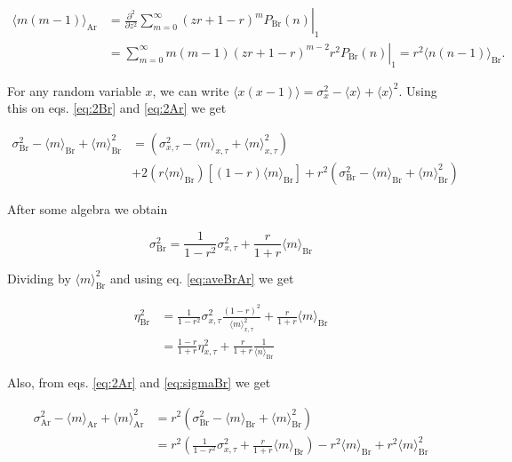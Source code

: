 \begin{equation}
  \label{eq:2Ar}
  \begin{split}
    \langle m(m-1)\rangle_\text{Ar} &= \left.\frac{\partial^2}{\partial z^2}\sum_{m=0}^\infty(zr+1-r)^mP_\text{Br}(n)\right|_1\\
    &= \left.\sum_{m=0}^\infty m(m-1)(zr+1-r)^{m-2}r^2P_\text{Br}(n)\right|_1 = r^2\langle n(n-1)\rangle_\text{Br}.
  \end{split}
\end{equation}

For any random variable $x$, we can write $\langle x(x-1)\rangle = \sigma_x^2 - \langle x\rangle + \langle x\rangle^2$. Using this on eqs. \ref{eq:2Br} and \ref{eq:2Ar} we get

\begin{equation*}
  \begin{split}
  \sigma^2_\text{Br}- \langle m\rangle_\text{Br} + \langle m\rangle^2_\text{Br} &= \left( \sigma^2_{x,\tau} - \langle m\rangle_{x,\tau} + \langle m\rangle_{x,\tau}^2\right)\\
&+ 2\left(r\langle m\rangle_\text{Br}\right)\left[(1-r)\langle m\rangle_\text{Br}\right]+r^2\left(\sigma^2_\text{Br}- \langle m\rangle_\text{Br} + \langle m\rangle^2_\text{Br}\right)
  \end{split}
\end{equation*}

After some algebra we obtain

\begin{equation}
  \label{eq:sigmaBr}
  \sigma^2_\text{Br} = \frac{1}{1-r^2}\sigma^2_{x,\tau}+\frac{r}{1+r}\langle m\rangle_\text{Br}
\end{equation}

Dividing by $\langle m\rangle_\text{Br}^2$ and using eq. \ref{eq:aveBrAr} we get

\begin{equation}
  \label{eq:bur-etaBr}
  \begin{split}
    \eta_\text{Br}^2 &= \frac{1}{1-r^2}\sigma_{x,\tau}^2\frac{(1-r)^2}{\langle m\rangle_{x,\tau}^2} + \frac{r}{1+r}\langle m\rangle_\text{Br}\\
    & = \frac{1-r}{1+r}\eta_{x,\tau}^2+\frac{r}{1+r}\frac{1}{\langle n\rangle_\text{Br}}
  \end{split}
\end{equation}

Also, from eqs. \ref{eq:2Ar} and \ref{eq:sigmaBr} we get

\begin{equation}
  \begin{split}
    \sigma^2_\text{Ar} - \langle m\rangle_\text{Ar} + \langle m\rangle_\text{Ar}^2 &= r^2\left(\sigma^2_\text{Br}- \langle m\rangle_\text{Br} + \langle m\rangle^2_\text{Br}\right)\\
  &=r^2\left(\frac{1}{1-r^2}\sigma^2_{x,\tau}+\frac{r}{1+r}\langle m\rangle_\text{Br}\right)-r^2\langle m\rangle_\text{Br} + r^2\langle m\rangle^2_\text{Br}
  \end{split}
\end{equation}

